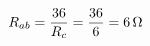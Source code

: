 \documentclass[preview]{standalone}
\begin{document}
\begin{align*}
\special{dvisvgm:raw <g id='unique000'>}R_{ab} = \frac{36}{R_c} = \frac{36}{6} = 6\,\Omega\special{dvisvgm:raw </g>}
\end{align*}
\end{document}
